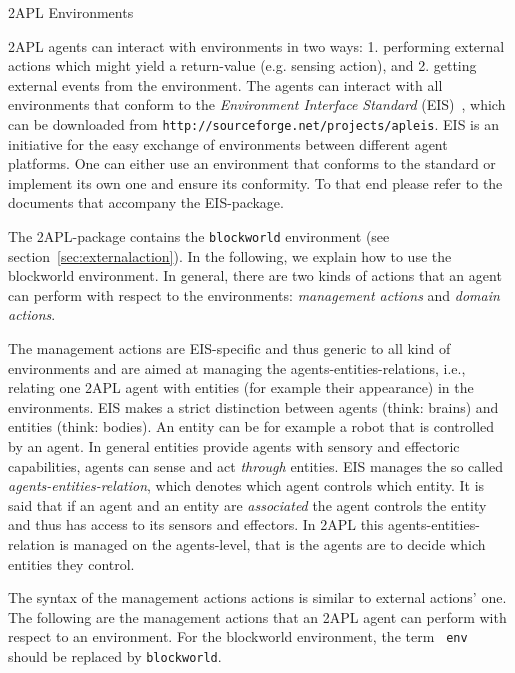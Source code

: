 
\begin{chapter}{2APL Environments}
\label{chap:environment}

2APL agents can interact with environments in two ways: 1.
performing external actions which might yield a return-value (e.g.
sensing action), and 2. getting external events from the
environment. The agents can interact with all environments that
conform to the \emph{Environment Interface Standard}
(EIS)~\cite{ifi0910behrens}, which can be downloaded from
\texttt{http://sourceforge.net/projects/apleis}. EIS is an
initiative for the easy exchange of environments between different
agent platforms. One can either use an environment that conforms to
the standard or implement its own one and ensure its conformity. To
that end please refer to the documents that accompany the
EIS-package.

The 2APL-package contains the \texttt{blockworld} environment
(see section~\ref{sec:externalaction}).
In the following, we explain
how to use the blockworld environment. In general, there are two kinds of
actions that an agent can perform with respect to the
environments: \emph{management actions} and \emph{domain actions}.


    The management actions are EIS-specific and thus generic to all kind of environments and are aimed
    at managing the agents-entities-relations, i.e., relating one 2APL agent with
    entities (for example their appearance) in the environments.
    EIS makes a strict distinction between agents (think: brains) and entities (think: bodies).
    An entity can be for example a robot that is controlled by an agent.
    In general entities provide agents with sensory and effectoric capabilities, agents can
    sense and act \emph{through} entities.
    EIS manages the
    so called \emph{agents-entities-relation}, which denotes which agent controls which
    entity. It is said that if an agent and an entity are \emph{associated} the agent controls the
    entity and thus has access to its sensors and effectors.
    In 2APL this agents-entities-relation is managed on the agents-level, that is the agents
    are to decide which entities they control.

    The syntax of the management actions
    actions is similar to external actions' one. The following are the
    management actions that an 2APL agent can perform with respect
    to an environment. For the blockworld environment, the term {\tt
    env} should be replaced by {\tt blockworld}.


\end{chapter}
